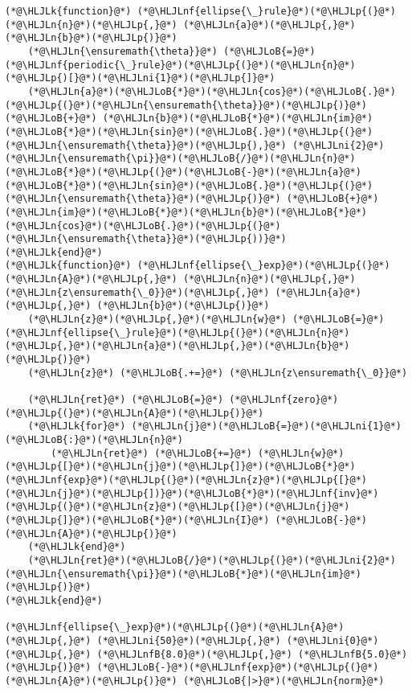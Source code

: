 \documentclass[12pt,a4paper]{article}
\newcommand{\HLJLk}[1]{\textcolor[RGB]{148,91,176}{\textbf{#1}}}
\newcommand{\HLJLn}[1]{#1}
\newcommand{\HLJLnf}[1]{\textcolor[RGB]{66,102,213}{#1}}
\newcommand{\HLJLnfB}[1]{\textcolor[RGB]{59,151,46}{#1}}
\newcommand{\HLJLni}[1]{\textcolor[RGB]{59,151,46}{#1}}
\newcommand{\HLJLoB}[1]{\textcolor[RGB]{102,102,102}{\textbf{#1}}}
\newcommand{\HLJLp}[1]{#1}
\begin{document}
\begin{lstlisting}
(*@\HLJLk{function}@*) (*@\HLJLnf{ellipse{\_}rule}@*)(*@\HLJLp{(}@*)(*@\HLJLn{n}@*)(*@\HLJLp{,}@*) (*@\HLJLn{a}@*)(*@\HLJLp{,}@*) (*@\HLJLn{b}@*)(*@\HLJLp{)}@*)
    (*@\HLJLn{\ensuremath{\theta}}@*) (*@\HLJLoB{=}@*) (*@\HLJLnf{periodic{\_}rule}@*)(*@\HLJLp{(}@*)(*@\HLJLn{n}@*)(*@\HLJLp{)[}@*)(*@\HLJLni{1}@*)(*@\HLJLp{]}@*)
    (*@\HLJLn{a}@*)(*@\HLJLoB{*}@*)(*@\HLJLn{cos}@*)(*@\HLJLoB{.}@*)(*@\HLJLp{(}@*)(*@\HLJLn{\ensuremath{\theta}}@*)(*@\HLJLp{)}@*) (*@\HLJLoB{+}@*) (*@\HLJLn{b}@*)(*@\HLJLoB{*}@*)(*@\HLJLn{im}@*)(*@\HLJLoB{*}@*)(*@\HLJLn{sin}@*)(*@\HLJLoB{.}@*)(*@\HLJLp{(}@*)(*@\HLJLn{\ensuremath{\theta}}@*)(*@\HLJLp{),}@*) (*@\HLJLni{2}@*)(*@\HLJLn{\ensuremath{\pi}}@*)(*@\HLJLoB{/}@*)(*@\HLJLn{n}@*)(*@\HLJLoB{*}@*)(*@\HLJLp{(}@*)(*@\HLJLoB{-}@*)(*@\HLJLn{a}@*)(*@\HLJLoB{*}@*)(*@\HLJLn{sin}@*)(*@\HLJLoB{.}@*)(*@\HLJLp{(}@*)(*@\HLJLn{\ensuremath{\theta}}@*)(*@\HLJLp{)}@*) (*@\HLJLoB{+}@*) (*@\HLJLn{im}@*)(*@\HLJLoB{*}@*)(*@\HLJLn{b}@*)(*@\HLJLoB{*}@*)(*@\HLJLn{cos}@*)(*@\HLJLoB{.}@*)(*@\HLJLp{(}@*)(*@\HLJLn{\ensuremath{\theta}}@*)(*@\HLJLp{))}@*)
(*@\HLJLk{end}@*)
(*@\HLJLk{function}@*) (*@\HLJLnf{ellipse{\_}exp}@*)(*@\HLJLp{(}@*)(*@\HLJLn{A}@*)(*@\HLJLp{,}@*) (*@\HLJLn{n}@*)(*@\HLJLp{,}@*) (*@\HLJLn{z\ensuremath{\_0}}@*)(*@\HLJLp{,}@*) (*@\HLJLn{a}@*)(*@\HLJLp{,}@*) (*@\HLJLn{b}@*)(*@\HLJLp{)}@*)
    (*@\HLJLn{z}@*)(*@\HLJLp{,}@*)(*@\HLJLn{w}@*) (*@\HLJLoB{=}@*) (*@\HLJLnf{ellipse{\_}rule}@*)(*@\HLJLp{(}@*)(*@\HLJLn{n}@*)(*@\HLJLp{,}@*)(*@\HLJLn{a}@*)(*@\HLJLp{,}@*)(*@\HLJLn{b}@*)(*@\HLJLp{)}@*)
    (*@\HLJLn{z}@*) (*@\HLJLoB{.+=}@*) (*@\HLJLn{z\ensuremath{\_0}}@*)

    (*@\HLJLn{ret}@*) (*@\HLJLoB{=}@*) (*@\HLJLnf{zero}@*)(*@\HLJLp{(}@*)(*@\HLJLn{A}@*)(*@\HLJLp{)}@*)
    (*@\HLJLk{for}@*) (*@\HLJLn{j}@*)(*@\HLJLoB{=}@*)(*@\HLJLni{1}@*)(*@\HLJLoB{:}@*)(*@\HLJLn{n}@*)
        (*@\HLJLn{ret}@*) (*@\HLJLoB{+=}@*) (*@\HLJLn{w}@*)(*@\HLJLp{[}@*)(*@\HLJLn{j}@*)(*@\HLJLp{]}@*)(*@\HLJLoB{*}@*)(*@\HLJLnf{exp}@*)(*@\HLJLp{(}@*)(*@\HLJLn{z}@*)(*@\HLJLp{[}@*)(*@\HLJLn{j}@*)(*@\HLJLp{])}@*)(*@\HLJLoB{*}@*)(*@\HLJLnf{inv}@*)(*@\HLJLp{(}@*)(*@\HLJLn{z}@*)(*@\HLJLp{[}@*)(*@\HLJLn{j}@*)(*@\HLJLp{]}@*)(*@\HLJLoB{*}@*)(*@\HLJLn{I}@*) (*@\HLJLoB{-}@*) (*@\HLJLn{A}@*)(*@\HLJLp{)}@*)
    (*@\HLJLk{end}@*)
    (*@\HLJLn{ret}@*)(*@\HLJLoB{/}@*)(*@\HLJLp{(}@*)(*@\HLJLni{2}@*)(*@\HLJLn{\ensuremath{\pi}}@*)(*@\HLJLoB{*}@*)(*@\HLJLn{im}@*)(*@\HLJLp{)}@*)
(*@\HLJLk{end}@*)

(*@\HLJLnf{ellipse{\_}exp}@*)(*@\HLJLp{(}@*)(*@\HLJLn{A}@*)(*@\HLJLp{,}@*) (*@\HLJLni{50}@*)(*@\HLJLp{,}@*) (*@\HLJLni{0}@*)(*@\HLJLp{,}@*) (*@\HLJLnfB{8.0}@*)(*@\HLJLp{,}@*) (*@\HLJLnfB{5.0}@*)(*@\HLJLp{)}@*) (*@\HLJLoB{-}@*)(*@\HLJLnf{exp}@*)(*@\HLJLp{(}@*)(*@\HLJLn{A}@*)(*@\HLJLp{)}@*) (*@\HLJLoB{|>}@*)(*@\HLJLn{norm}@*)
\end{lstlisting}
\end{document}
